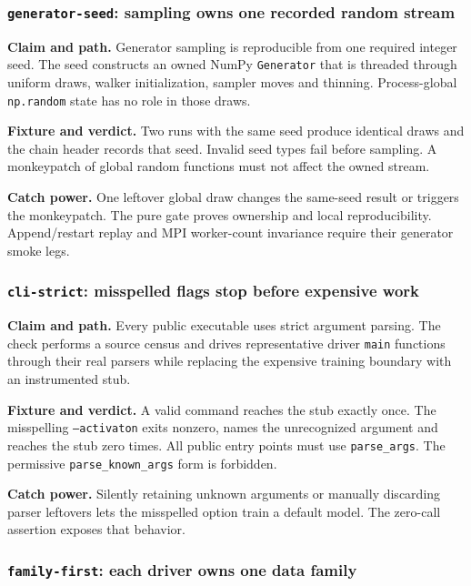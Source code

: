 \documentclass[10pt,aps,prd,twocolumn,nofootinbib]{revtex4-2}
\newcommand{\code}[1]{\texttt{#1}}
\begin{document}
\subsubsection{\code{generator-seed}: sampling owns one recorded random stream}

\textbf{Claim and path.}  Generator sampling is reproducible from one required
integer seed.  The seed constructs an owned NumPy \code{Generator} that is
threaded through uniform draws, walker initialization, sampler moves and
thinning.  Process-global \code{np.random} state has no role in those draws.

\textbf{Fixture and verdict.}  Two runs with the same seed produce identical
draws and the chain header records that seed.  Invalid seed types fail before
sampling.  A monkeypatch of global random functions must not affect the owned
stream.

\textbf{Catch power.}  One leftover global draw changes the same-seed result
or triggers the monkeypatch.  The pure gate proves ownership and local
reproducibility.  Append/restart replay and MPI worker-count invariance require
their generator smoke legs.

\subsubsection{\code{cli-strict}: misspelled flags stop before expensive work}

\textbf{Claim and path.}  Every public executable uses strict argument
parsing.  The check performs a source census and drives representative driver
\code{main} functions through their real parsers while replacing the
expensive training boundary with an instrumented stub.

\textbf{Fixture and verdict.}  A valid command reaches the stub exactly once.
The misspelling \code{--activaton} exits nonzero, names the unrecognized
argument and reaches the stub zero times.  All public entry points must use
\code{parse\_args}.  The permissive \code{parse\_known\_args} form is forbidden.

\textbf{Catch power.}  Silently retaining unknown arguments or manually
discarding parser leftovers lets the misspelled option train a default model.
The zero-call assertion exposes that behavior.

\subsubsection{\code{family-first}: each driver owns one data family}
\end{document}
